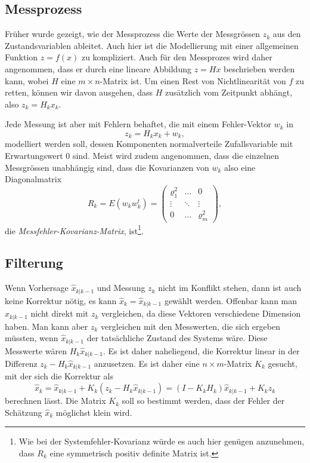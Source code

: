 \subsection{Messprozess\label{subsection:messprozess}}
Früher wurde gezeigt, wie der Messprozess die Werte der Messgrössen $z_k$
aus den Zustandsvariablen ableitet.
Auch hier ist die Modellierung mit einer allgemeinen Funktion $z=f(x)$ 
zu kompliziert.
Auch für den Messprozes wird daher angenommen, dass er durch eine
lineare Abbildung $z=Hx$ beschrieben werden kann, wobei $H$ eine
$m\times n$-Matrix ist.
Um einen Rest von Nichtlinearität von $f$ zu retten, können wir davon
ausgehen, dass $H$ zusätzlich vom Zeitpunkt abhängt, also $z_k=H_kx_k$.

Jede Messung ist aber mit Fehlern behaftet, die mit einem Fehler-Vektor
$w_k$ in
\begin{equation}
z_k = H_kx_k + w_k,
\label{skript:kalman:messfehler}
\end{equation}
modelliert werden soll,
dessen Komponenten normalverteile Zufallsvariable mit Erwartungswert $0$
sind.
Meist wird zudem angenommen, dass die einzelnen Messgrössen unabhängig
sind, dass die Kovarianzen von $w_k$ also eine
Diagonalmatrix
\[
R_k = E(w_kw_k^t) =
\begin{pmatrix}
\varrho_1^2&\dots & 0\\
\vdots     &\ddots&\vdots\\
0          &\dots &\varrho_m^2
\end{pmatrix},
\]
die {\em Messfehler-Kovarianz-Matrix},
ist\footnote{Wie bei der Systemfehler-Kovarianz würde es auch hier
genügen anzunehmen, dass $R_k$ eine symmetrisch positiv definite Matrix
ist.}.
%
%

\subsection{Filterung\label{subsection:filterung}}
Wenn Vorhersage $\hat{x}_{k|k-1}$ und Messung $z_k$ nicht im Konflikt
stehen, dann ist auch keine Korrektur nötig, es kann
$\hat{x}_k = \hat{x}_{k|k-1}$ gewählt werden.
Offenbar kann man $\hat{x}_{k|k-1}$ nicht direkt mit $z_k$ vergleichen,
da diese Vektoren verschiedene Dimension haben.
Man kann aber $z_k$ vergleichen mit den Messwerten, die sich ergeben
müssten, wenn $\hat{x}_{k|k-1}$ der tatsächliche Zustand des Systems
wäre.
Diese Messwerte wären $H_k\hat{x}_{k|k-1}$.
Es ist daher naheliegend,
die Korrektur linear in der Differenz $z_k-H_k\hat{x}_{k|k-1}$
anzusetzen.
Es ist daher eine $n\times m$-Matrix $K_k$ gesucht, mit der sich
die Korrektur als
\begin{equation}
\hat{x}_{k}
=
\hat{x}_{k|k-1} + K_k(z_k-H_k\hat{x}_{k|k-1})
=
(I-K_kH_k)\hat{x}_{k|k-1} + K_kz_k
\label{skript:kalman:filter}
\end{equation}
berechnen lässt.
Die Matrix $K_k$ soll so bestimmt werden, dass der Fehler der
Schätzung $\hat{x}_k$ möglichst klein wird.

